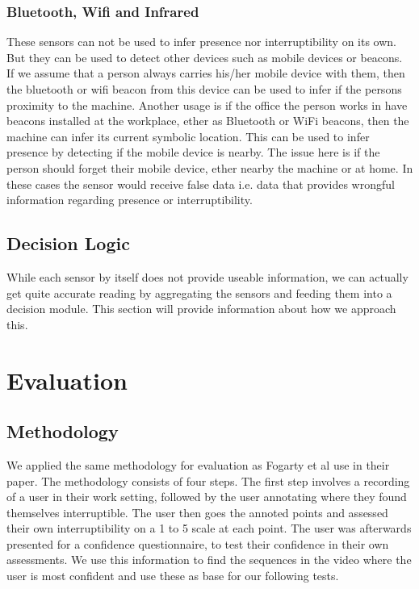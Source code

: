 \documentclass{sigchi}
\begin{document}
\subsubsection{Bluetooth, Wifi and Infrared}
These sensors can not be used to infer presence nor interruptibility on its own.
But they can be used to detect other devices such as mobile devices or beacons.
If we assume that a person always carries his/her mobile device with them, then the bluetooth or wifi beacon from this device can be used to infer if the persons proximity to the machine.
Another usage is if the office the person works in have beacons installed at the workplace, ether as Bluetooth or WiFi beacons, then the machine can infer its current symbolic location.
This can be used to infer presence by detecting if the mobile device is nearby.
The issue here is if the person should forget their mobile device, ether nearby the machine or at home.
In these cases the sensor would receive false data i.e. data that provides wrongful information regarding presence or interruptibility.


\subsection{Decision Logic}
While each sensor by itself does not provide useable information, we can actually get quite accurate reading by aggregating the sensors and feeding them into a decision module.
This section will provide information about how we approach this.


\section{Evaluation}

\subsection{Methodology}
We applied the same methodology for evaluation as Fogarty et al \cite{fogarty2005predicting} use in their paper.
The methodology consists of four steps.
The first step involves a recording of a user in their work setting, followed by the user annotating where they found themselves interruptible.
The user then goes the annoted points and assessed their own interruptibility on a 1 to 5 scale at each point.
The user was afterwards presented for a confidence questionnaire, to test their confidence in their own assessments.
We use this information to find the sequences in the video where the user is most confident and use these as base for our following tests.
\end{document}
